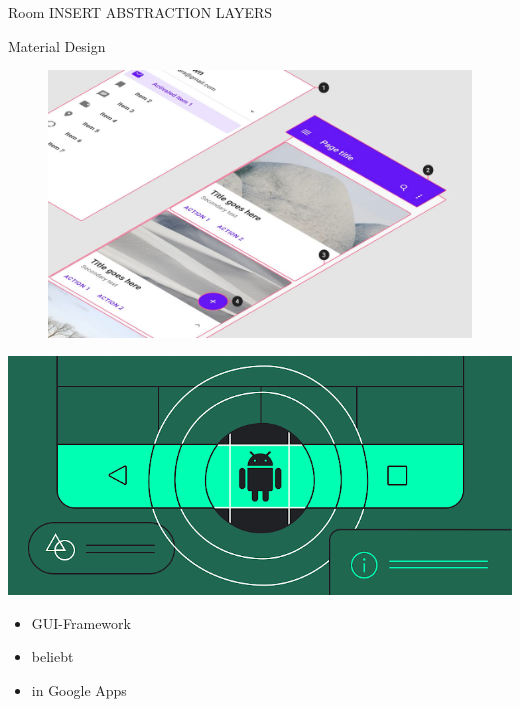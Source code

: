 \documentclass[aspectratio=169]{beamer}
\begin{document}
\begin{frame}{Room}
INSERT ABSTRACTION LAYERS
\end{frame}

\begin{frame}{Material Design}
\begin{varwidth}{.5\textwidth}
        \begin{figure}
            \centering
            \includegraphics[width=\textwidth]{media/material-design-in-action.jpg}
        \end{figure}
    \end{varwidth}
    \hfill
    \begin{varwidth}{.4\textwidth}
        \includegraphics[width=\textwidth]{media/material-android.png}
        \begin{itemize}
            \item GUI-Framework
            \item beliebt
            \item in Google Apps
        \end{itemize}
    \end{varwidth}
\end{frame}
\end{document}

